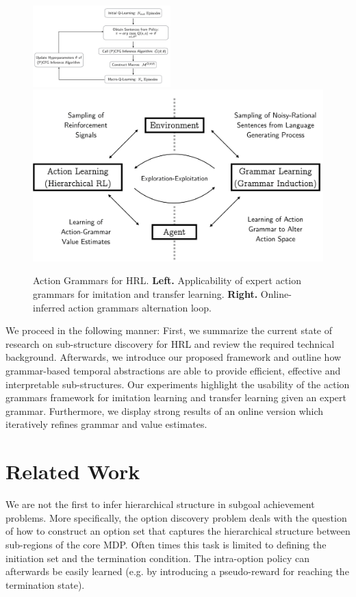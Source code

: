 \documentclass[colorinlistoftodos]{article}
\theoremstyle{definition}
\begin{document}
\begin{figure}[H]
    \centering
    \includegraphics[width=0.475\textwidth]{figures/concept_online_macro_learning.png}
    \includegraphics[width=0.475\linewidth]{figures/concept_al_gl.png}
    \caption{Action Grammars for HRL. \textbf{Left.} Applicability of expert action grammars for imitation and transfer learning. \textbf{Right.} Online-inferred action grammars alternation loop.}
    \label{fig:loop_ag}
\end{figure}

We proceed in the following manner: First, we summarize the current state of research on sub-structure discovery for HRL and review the required technical background. Afterwards, we introduce our proposed framework and outline how grammar-based temporal abstractions are able to provide efficient, effective and interpretable sub-structures. Our experiments highlight the usability of the action grammars framework for imitation learning and transfer learning given an expert grammar. Furthermore, we display strong results of an online version which iteratively refines grammar and value estimates. 

\section{Related Work}

We are not the first to infer hierarchical structure in subgoal achievement problems. More specifically, the option discovery problem deals with the question of how to construct an option set that captures the hierarchical structure between sub-regions of the core MDP. Often times this task is limited to defining the initiation set and the termination condition. The intra-option policy can afterwards be easily learned (e.g. by introducing a pseudo-reward for reaching the termination state).
\end{document}
